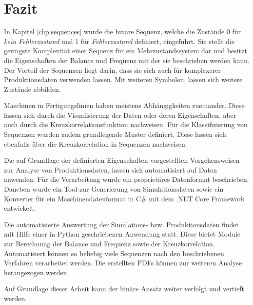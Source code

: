\chapter{Fazit}
\label{chp:conclusion}
In Kapitel \ref{chp:sequences} wurde die binäre Sequenz, welche die Zustände 0 für \textit{kein Fehlerzustand} und 1 für \textit{Fehlerzustand} definiert, eingeführt. Sie stellt die geringste Komplexität einer Sequenz für ein Mehrzustandssystem dar und besitzt die Eigenschaften der Balance und Frequenz mit der sie beschrieben werden kann. Der Vorteil der Sequenzen liegt darin, dass sie sich auch für komplexerer Produktionsdaten verwenden lassen. Mit weiteren Symbolen, lassen sich weitere Zustände abbilden.

Maschinen in Fertigungslinien haben meistens Abhängigkeiten zueinander. Diese lassen sich durch die Visualisierung der Daten oder deren Eigenschaften, aber auch durch die Kreuzkorrelationsfunktion nachweisen. Für die Klassifizierung von Sequenzen wurden zudem grundlegende Muster definiert. Diese lassen sich ebenfalls über die Kreuzkorrelation in Sequenzen nachweisen.

Die auf Grundlage der definierten Eigenschaften vorgestellten Vorgehensweisen zur Analyse von Produktionsdaten, lassen sich automatisiert auf Daten anwenden. Für die Verarbeitung wurde ein proprietäres Datenformat beschrieben. Daneben wurde ein Tool zur Generierung von Simulationsdaten sowie ein Konverter für ein Maschinendatenformat in C\# mit dem .NET Core Framework entwickelt.

Die automatisierte Auswertung der Simulations- bzw. Produktionsdaten findet mit Hilfe einer in Python geschriebenen Anwendung statt. Diese bietet Module zur Berechnung der Balance und Frequenz sowie der Kreuzkorrelation. Automatisiert können so beliebig viele Sequenzen nach den beschriebenen Verfahren verarbeitet werden. Die erstellten PDFs können zur weiteren Analyse herangezogen werden.

Auf Grundlage dieser Arbeit kann der binäre Ansatz weiter verfolgt und vertieft werden.